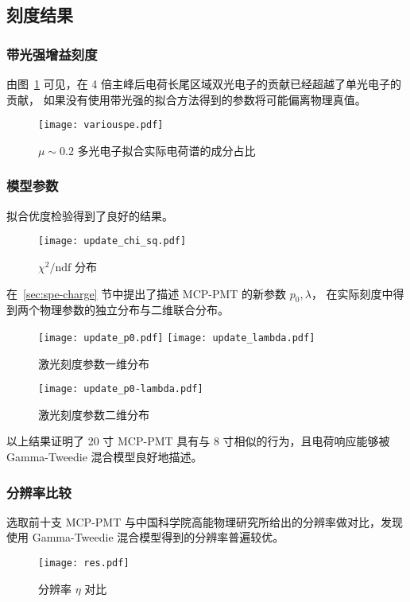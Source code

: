 \subsection{刻度结果}
\subsubsection{带光强增益刻度}
由图~\ref{fig:variouspe} 可见，在 4 倍主峰后电荷长尾区域双光电子的贡献已经超越了单光电子的贡献，
如果没有使用带光强的拟合方法得到的参数将可能偏离物理真值。
\begin{figure}
    \centering
    \texttt{[image: variouspe.pdf]}
    \caption{$\mu\sim0.2$ 多光电子拟合实际电荷谱的成分占比}
    \label{fig:variouspe}
\end{figure}

\subsubsection{模型参数}
拟合优度检验得到了良好的结果。
\begin{figure}
    \centering
    \texttt{[image: update\_chi\_sq.pdf]}
    \caption{$\chi^2/\text{ndf}$ 分布}
\end{figure}

在~\ref{sec:spe-charge} 节中提出了描述 MCP-PMT 的新参数 $p_0,\lambda$，
在实际刻度中得到两个物理参数的独立分布与二维联合分布。
\begin{figure}
    \centering
      {\texttt{[image: update\_p0.pdf]}}
      {\texttt{[image: update\_lambda.pdf]}}
    \caption{激光刻度参数一维分布}
\end{figure}

\begin{figure}
    \centering
    \texttt{[image: update\_p0-lambda.pdf]}
    \caption{激光刻度参数二维分布}
\end{figure}

以上结果证明了 20 寸 MCP-PMT 具有与 8 寸相似的行为，且电荷响应能够被 Gamma-Tweedie 混合模型良好地描述。

\subsubsection{分辨率比较}
选取前十支 MCP-PMT 与中国科学院高能物理研究所给出的分辨率做对比，发现使用 Gamma-Tweedie 混合模型得到的分辨率普遍较优。
\begin{figure}
    \centering
    \texttt{[image: res.pdf]}
    \caption{分辨率 $\eta$ 对比}
\end{figure}


